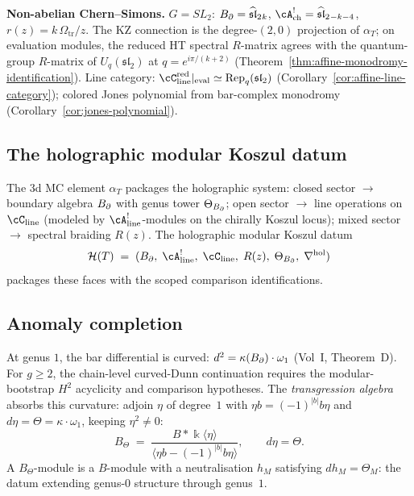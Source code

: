\medskip
\noindent\textbf{Non-abelian Chern--Simons.}\enspace
$G = SL_2$: $B_{\partial} = \widehat{\mathfrak{sl}}_2{}_k$,
$\cA^!_{\mathrm{ch}} = \widehat{\mathfrak{sl}}_2{}_{-k-4}$,
$r(z) = k\,\Omega_{\mathrm{tr}}/z$. The KZ connection is the degree-$(2,0)$
projection of $\alpha_T$; on evaluation modules, the reduced HT
spectral $R$-matrix agrees with the quantum-group $R$-matrix of
$U_q(\mathfrak{sl}_2)$ at $q = e^{i\pi/(k+2)}$
(Theorem~\ref{thm:affine-monodromy-identification}).
Line category:
$\cC_{\mathrm{line}}^{\mathrm{red}}|_{\mathrm{eval}}
\simeq \operatorname{Rep}_q(\mathfrak{sl}_2)$
(Corollary~\ref{cor:affine-line-category});
colored Jones polynomial from bar-complex monodromy
(Corollary~\ref{cor:jones-polynomial}).

\subsection*{The holographic modular Koszul datum}

The 3d MC element $\alpha_T$ packages the holographic system:
closed sector $\to$ boundary algebra $B_{\partial}$ with genus tower
$\Theta_{B_{\partial}}$; open sector $\to$ line operations on
$\cC_{\mathrm{line}}$ (modeled by
$\cA^!_{\mathrm{line}}$-modules on the chirally Koszul locus);
mixed sector $\to$ spectral braiding $R(z)$. The
holographic modular Koszul datum
\[
\mathcal{H}(T)
\;=\;
(\Bbound,\; \cA^!_{\mathrm{line}},\; \cC_{\mathrm{line}},\; R(z),\;
\Theta_{\Bbound},\; \nabla^{\mathrm{hol}})
\]
packages these faces with the scoped comparison identifications.

\subsection*{Anomaly completion}

At genus $1$, the bar differential is curved:
$d^2 = \kappa(B_{\partial}) \cdot \omega_1$ (Vol~I, Theorem~D).
For $g \ge 2$, the chain-level curved-Dunn continuation requires the
modular-bootstrap $H^2$ acyclicity and comparison hypotheses.
The \emph{transgression algebra} absorbs this curvature: adjoin
$\eta$ of degree~$1$ with
$\eta b = (-1)^{|b|} b \eta$ and
$d\eta = \Theta = \kappa \cdot \omega_1$, keeping $\eta^2 \ne 0$:
\[
B_\Theta
\;=\;
\frac{B * \Bbbk\langle\eta\rangle}
{\langle \eta b - (-1)^{|b|} b\eta \rangle},
\qquad
d\eta = \Theta.
\]
A $B_\Theta$-module is a $B$-module with a neutralisation
$h_M$ satisfying $dh_M = \Theta_M$: the datum extending
genus-$0$ structure through genus~$1$.

